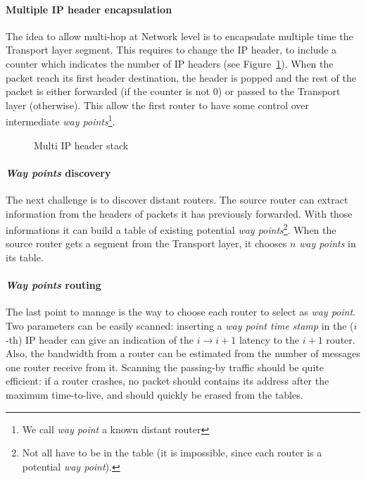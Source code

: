 \documentclass[twocolumn]{article}
\begin{document}
\paragraph{Multiple IP header encapsulation}
The idea to allow multi-hop at Network level is to encapsulate multiple time the Transport layer segment. This requires to change the IP header, to include a counter which indicates the number of IP headers (see Figure~\ref{fig:multi_ip_header_stack}). When the packet reach its first header destination, the header is popped and the rest of the packet is either forwarded (if the counter is not $0$) or passed to the Transport layer (otherwise). This allow the first router to have some control over intermediate \emph{way points}\footnote{We call \emph{way point} a known distant router}.
\begin{figure}
	\centering
	\begin{drawstack}
	\end{drawstack}
	\caption{Multi IP header stack}
	\label{fig:multi_ip_header_stack}
\end{figure}

\paragraph{\emph{Way points} discovery} 
The next challenge is to discover distant routers. The source router can extract information from the headers of packets it has previously forwarded. With those informations it can build a table of existing potential \emph{way points}\footnote{Not all have to be in the table (it is impossible, since each router is a potential \emph{way point}).}. When the source router gets a segment from the Transport layer, it chooses $n$ \emph{way points} in its table.

\paragraph{\emph{Way points} routing}
The last point to manage is the way to choose each router to select as \emph{way point}. Two parameters can be easily scanned: inserting a \emph{way point time stamp} in the ($i$-th) IP header can give an indication of the $i\rightarrow i+1$ latency to the $i+1$ router. Also, the bandwidth from a router can be estimated from the number of messages one router receive from it. Scanning the passing-by traffic should be quite efficient: if a router crashes, no packet should contains its address after the maximum time-to-live, and should quickly be erased from the tables.
\end{document}
